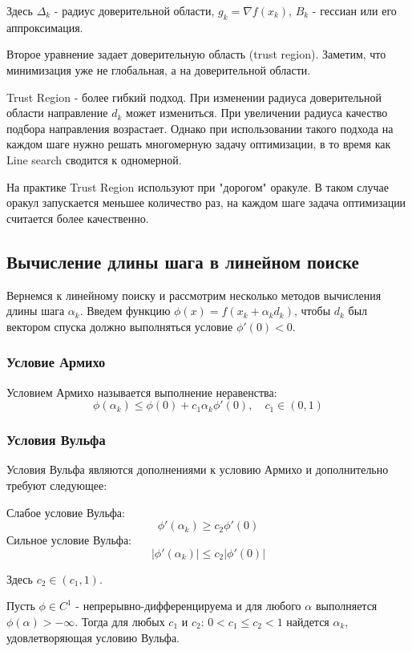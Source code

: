 \documentclass[a4paper, 12pt]{article}
\begin{document}
Здесь $\Delta_k$ - радиус доверительной области, $g_k = \nabla f(x_k)$, $B_k$ - гессиан или его аппроксимация.

Второе уравнение задает доверительную область (trust region). Заметим, что минимизация уже не глобальная, а на доверительной области.

Trust Region - более гибкий подход. При изменении радиуса доверительной области направление $d_k$ может измениться. При увеличении радиуса качество подбора направления возрастает. Однако при использовании такого подхода на каждом шаге нужно решать многомерную задачу оптимизации, в то время как Line search сводится к одномерной. 


На практике Trust Region используют при "дорогом" оракуле. В таком случае оракул запускается меньшее количество раз, на каждом шаге задача оптимизации считается более качественно. 

\subsection{Вычисление длины шага в линейном поиске}

Вернемся к линейному поиску и рассмотрим несколько методов вычисления длины шага $\alpha_k$. Введем функцию $\phi(x) = f(x_k + \alpha_k d_k)$, чтобы $d_k$ был вектором спуска должно выполняться условие $\phi'(0) < 0$.

\subsubsection*{Условие Армихо}

Условием Армихо называется выполнение неравенства:
$$\phi(\alpha_k) \leq \phi(0) + c_1\alpha_k\phi'(0), \quad c_1 \in (0,1) $$

\subsubsection*{Условия Вульфа}

Условия Вульфа являются дополнениями к условию Армихо и дополнительно требуют следующее:

Слабое условие Вульфа:
$$\phi'(\alpha_k) \geq c_2 \phi'(0) $$
Сильное условие Вульфа:
$$|\phi'(\alpha_k)| \leq c_2 |\phi'(0)| $$

Здесь $c_2 \in (c_1,1)$.

\begin{Statement}
Пусть $\phi \in C^1$ - непрерывно-дифференцируема и для любого $\alpha$ выполняется $\phi(\alpha) > -\infty$. Тогда для любых $c_1$ и $c_2$: $0 < c_1 \leq c_2 < 1$ найдется $\alpha_k$, удовлетворяющая условию Вульфа.
\end{Statement}
\end{document}
